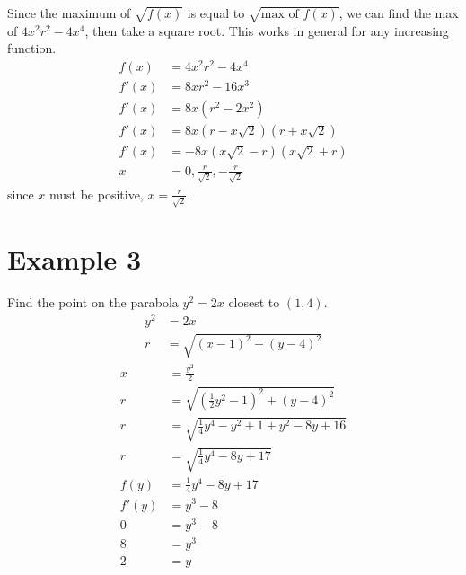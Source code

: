 \documentclass{article}
\theoremstyle{mytheoremstyle}
\theoremstyle{mytheoremstyle}
\theoremstyle{myproblemstyle}
\begin{document}
    Since the maximum of $\sqrt{f(x)}$ is equal to $\sqrt{\text{max of }f(x)}$,
    we can find the max of $4x^2r^2-4x^4$, then take a square root. This works
    in general for any increasing function.
    \begin{align*}
        f(x) &=4x^2r^2-4x^4 \\
        f'(x) &= 8xr^2 - 16x^3 \\
        f'(x) &= 8x(r^2 - 2x^2) \\
        f'(x) &= 8x(r-x\sqrt{2})(r+x\sqrt{2}) \\
        f'(x) &= -8x(x\sqrt{2}-r)(x\sqrt{2}+r) \\
        x &= 0, \frac{r}{\sqrt{2}}, -\frac{r}{\sqrt{2}}
    \end{align*}
    since $x$ must be positive, $x=\frac{r}{\sqrt{2}}$.

    \section*{Example 3}
    Find the point on the parabola $y^2=2x$ closest to $(1,4)$.
    \begin{align*}
        y^2&=2x \\
        r  &= \sqrt{(x-1)^2+(y-4)^2}
    \end{align*}
    \begin{align*}
        x &= \frac{y^2}{2} \\
        r &= \sqrt{(\frac{1}{2}y^2-1)^2+(y-4)^2} \\
        r &= \sqrt{\frac{1}{4} y^4 -y^2+1 + y^2-8y+16} \\
        r &= \sqrt{\frac{1}{4} y^4 -8y + 17} \\
        f(y) &= \frac{1}{4} y^4 -8y + 17 \\
        f'(y) &= y^3 -8 \\
        0 &= y^3 -8 \\
        8 &= y^3 \\
        2 &= y
    \end{align*}
\end{document}
